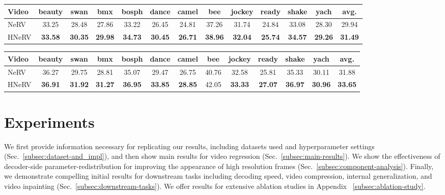 \documentclass[10pt,twocolumn,letterpaper]{article}
\begin{document}
\begin{table*}[t!]
\centering
\caption{Video regression at resolution \textbf{960}$\times$\textbf{1920}, PSNR$\uparrow$ reported}
\label{tab:video-960p}
\vspace{-0.5em}
\begin{tabular}{@{}l|ccccccccccc|c@{}}
\toprule
Video & beauty & swan & bmx & bosph & dance & camel & bee & jockey & ready & shake & yach & avg.   \\
\midrule
NeRV    & 33.25  & 28.48          & 27.86          & 33.22    & 26.45           & 24.81      & 37.26    & 31.74  & 24.84         & 33.08     & 28.30     & 29.94 \\
HNeRV   & \textbf{33.58}  & \textbf{30.35}          & \textbf{29.98}          & \textbf{34.73}    & \textbf{30.45  }         & \textbf{26.71  }    & \textbf{38.96}    & \textbf{32.04}  & \textbf{25.74  }       & \textbf{34.57 }    & \textbf{29.26}     & \textbf{31.49} \\
\bottomrule
\end{tabular}

\caption{Video regression at resolution \textbf{480}$\times$\textbf{960}, PSNR$\uparrow$ reported}
\label{tab:video-480p}
\begin{tabular}{@{}l|ccccccccccc|c@{}}
\toprule
Video & beauty & swan & bmx & bosph & dance & camel & bee & jockey & ready & shake & yach & avg.   \\
\midrule
NeRV    & 36.27  & 29.75          & 28.81          & 35.07    & 29.47           & 26.75      & 40.76    & 32.58  & 25.81         & 35.33     & 30.11     & 31.88 \\
HNeRV   & \textbf{36.91}  & \textbf{31.92}          & \textbf{31.27}          & \textbf{36.95}    & \textbf{33.85}           & \textbf{28.85}      & 42.05    & \textbf{33.33}  & \textbf{27.07 }        & \textbf{36.97 }    & \textbf{30.96}     & \textbf{33.65} \\
\bottomrule
\end{tabular}
\end{table*}


\section{Experiments}
\label{sec:experiments}

We first provide information necessary for replicating our results, including datasets used and hyperparameter settings (Sec.~\ref{subsec:dataset-and_impl}), and then show main results for video regression (Sec.~\ref{subsec:main-results}).
We show the effectiveness of decoder-side parameter-redistribution for improving the appearance of high resolution frames (Sec.~\ref{subsec:component-analysis}).
Finally, we demonstrate compelling initial results for downstream tasks including  decoding speed, video compression, internal generalization, and video inpainting (Sec.~\ref{subsec:downstream-tasks}).
We offer results for extensive ablation studies in Appendix ~\ref{subsec:ablation-study}.
\end{document}

